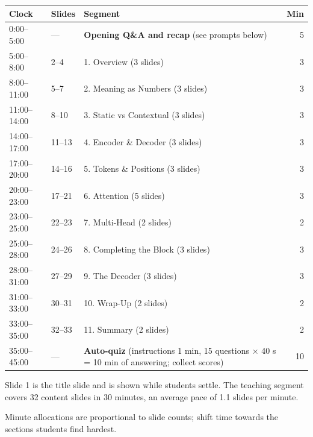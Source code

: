 \documentclass[11pt]{article}
\begin{document}
\begin{center}\small\renewcommand{\arraystretch}{1.2}\begin{tabularx}{\textwidth}{@{}l l X r@{}}\toprule\textbf{Clock} & \textbf{Slides} & \textbf{Segment} & \textbf{Min}\\\midrule

0:00--5:00 & --- & \textbf{Opening Q\&A and recap} (see prompts below) & 5\\

5:00--8:00 & 2--4 & 1. Overview (3 slides) & 3\\

8:00--11:00 & 5--7 & 2. Meaning as Numbers (3 slides) & 3\\

11:00--14:00 & 8--10 & 3. Static vs Contextual (3 slides) & 3\\

14:00--17:00 & 11--13 & 4. Encoder \& Decoder (3 slides) & 3\\

17:00--20:00 & 14--16 & 5. Tokens \& Positions (3 slides) & 3\\

20:00--23:00 & 17--21 & 6. Attention (5 slides) & 3\\

23:00--25:00 & 22--23 & 7. Multi-Head (2 slides) & 2\\

25:00--28:00 & 24--26 & 8. Completing the Block (3 slides) & 3\\

28:00--31:00 & 27--29 & 9. The Decoder (3 slides) & 3\\

31:00--33:00 & 30--31 & 10. Wrap-Up (2 slides) & 2\\

33:00--35:00 & 32--33 & 11. Summary (2 slides) & 2\\

35:00--45:00 & --- & \textbf{Auto-quiz} (instructions 1 min, 15 questions $\times$ 40 s = 10 min of answering; collect scores) & 10\\\bottomrule\end{tabularx}\end{center}

Slide 1 is the title slide and is shown while students settle. The teaching segment covers 32 content slides in 30 minutes, an average pace of 1.1 slides per minute. 

Minute allocations are proportional to slide counts; shift time towards the sections students find hardest.
\end{document}
